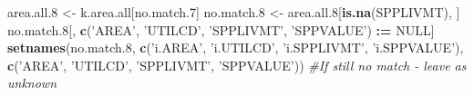 \documentclass[]{article}
\newenvironment{Shaded}{\begin{snugshade}}{\end{snugshade}}
\newcommand{\KeywordTok}[1]{\textcolor[rgb]{0.13,0.29,0.53}{\textbf{#1}}}
\newcommand{\DecValTok}[1]{\textcolor[rgb]{0.00,0.00,0.81}{#1}}
\newcommand{\StringTok}[1]{\textcolor[rgb]{0.31,0.60,0.02}{#1}}
\newcommand{\CommentTok}[1]{\textcolor[rgb]{0.56,0.35,0.01}{\textit{#1}}}
\newcommand{\OtherTok}[1]{\textcolor[rgb]{0.56,0.35,0.01}{#1}}
\newcommand{\OperatorTok}[1]{\textcolor[rgb]{0.81,0.36,0.00}{\textbf{#1}}}
\newcommand{\ErrorTok}[1]{\textcolor[rgb]{0.64,0.00,0.00}{\textbf{#1}}}
\newcommand{\NormalTok}[1]{#1}
\begin{document}
\begin{Shaded}
\begin{Highlighting}[]
{{\NormalTok{  area.all.}\DecValTok{8}\NormalTok{ <-}\StringTok{ }\NormalTok{k.area.all[no.match.}\DecValTok{7}\NormalTok{]}
\NormalTok{  no.match.}\DecValTok{8}\NormalTok{ <-}\StringTok{ }\NormalTok{area.all.}\DecValTok{8}\NormalTok{[}\KeywordTok{is.na}\NormalTok{(SPPLIVMT), ]}
\NormalTok{  no.match.}\DecValTok{8}\NormalTok{[, }\KeywordTok{c}\NormalTok{(}\StringTok{'AREA'}\NormalTok{, }\StringTok{'UTILCD'}\NormalTok{, }\StringTok{'SPPLIVMT'}\NormalTok{, }\StringTok{'SPPVALUE'}\NormalTok{) }\OperatorTok{:}\ErrorTok{=}\StringTok{ }\OtherTok{NULL}\NormalTok{]}
  \KeywordTok{setnames}\NormalTok{(no.match.}\DecValTok{8}\NormalTok{, }\KeywordTok{c}\NormalTok{(}\StringTok{'i.AREA'}\NormalTok{, }\StringTok{'i.UTILCD'}\NormalTok{, }\StringTok{'i.SPPLIVMT'}\NormalTok{, }\StringTok{'i.SPPVALUE'}\NormalTok{), }
           \KeywordTok{c}\NormalTok{(}\StringTok{'AREA'}\NormalTok{, }\StringTok{'UTILCD'}\NormalTok{, }\StringTok{'SPPLIVMT'}\NormalTok{, }\StringTok{'SPPVALUE'}\NormalTok{))}
  \CommentTok{#If still no match - leave as unknown}

}}
\end{Highlighting}
\end{Shaded}
\end{document}
